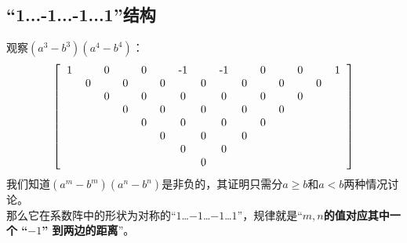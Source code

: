 \documentclass[UTF8]{ctexart}
\begin{document}
\subsection{“1...-1...-1...1”结构}
观察$ (a^{3}-b^{3})(a^{4}-b^{4})$：
\renewcommand*{\arraystretch}{1.732}\[
\left[\begin{matrix}
	\begin{tabular}{ccccccccccccccc}
		1& &0& &0& &-1& &-1& &0& &0& &1\\
		&0& &0& &0& &0& &0& &0& &0&\\
		& &0& &0& &0& &0& &0& &0& &\\
		& & &0& &0& &0& &0& &0& & &\\
		& & & &0& &0& &0& &0& & & &\\
		& & & & &0& &0& &0& & & & &\\
		& & & & & &0& &0& & & & & &\\
		& & & & & & &0& & & & & & &\\
	\end{tabular}
\end{matrix}\right]
\]
我们知道$ (a^{m}-b^{m})(a^{n}-b^{n})$是非负的，其证明只需分$ a\ge b $和$ a<b $两种情况讨论。\\
那么它在系数阵中的形状为对称的“$ 1 $…$ -1 $…$ -1 $…$ 1 $”，规律就是“\textbf{$ m,n $的值对应其中一个 “$-1$” 到两边的距离}”。
\end{document}
